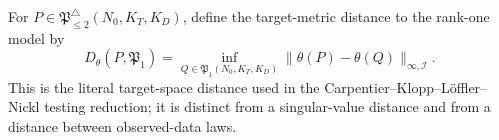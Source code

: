 For \(P\in\mathfrak P_{\le2}^{\triangle}(N_0,K_T,K_D)\), define the target-metric distance to the rank-one model by
\[
 D_\theta(P,\mathfrak P_1)
 =\inf_{Q\in\mathfrak P_1(N_0,K_T,K_D)}
   \|\theta(P)-\theta(Q)\|_{\infty,\mathcal I}.
\]
This is the literal target-space distance used in the Carpentier--Klopp--L\"offler--Nickl testing reduction; it is distinct from a singular-value distance and from a distance between observed-data laws.